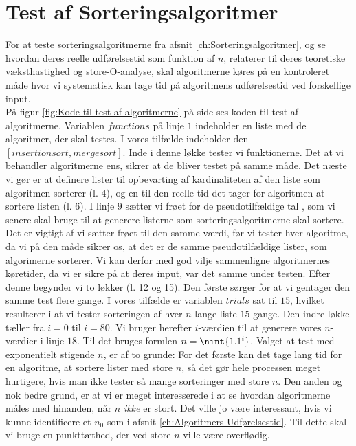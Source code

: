 \section{Test af Sorteringsalgoritmer}
\label{sec:Test af Sorteringsalgoritmer}

For at teste sorteringsalgoritmerne fra afsnit \ref{ch:Sorteringsalgoritmer}, og se hvordan deres reelle udførelsestid som funktion af $n$, relaterer til deres teoretiske væksthastighed og store-O-analyse, skal algoritmerne køres på en kontroleret måde hvor vi systematisk kan tage tid på algoritmens udførelsestid ved forskellige input.\\

På figur \ref{fig:Kode til test af algoritmerne} på side \pageref{fig:Kode til test af algoritmerne} ses koden til test af algoritmerne. Variablen $functions$ på linje $1$ indeholder en liste med de algoritmer, der skal testes. I vores tilfælde indeholder den $[insertionsort,mergesort]$. Inde i denne løkke tester vi funktionerne. Det at vi behandler algoritmerne ens, sikrer at de bliver testet på samme måde. Det næste vi gør er at definere lister til opbevarting af kardinaliteten af den liste som algoritmen sorterer (l. $4$), og en til den reelle tid det tager for algoritmen at sortere listen (l. 6).  I linje $9$ sætter vi frøet for de pseudotilfældige tal \cite{python-random}, som vi senere skal bruge til at generere listerne som sorteringsalgoritmerne skal sortere. Det er vigtigt af vi sætter frøet til den samme værdi, før vi tester hver algoritme, da vi på den måde sikrer os, at det er de samme pseudotilfældige lister, som algorimerne sorterer. Vi kan derfor med god vilje sammenligne algoritmernes køretider, da vi er sikre på at deres input, var det samme under testen. Efter denne  begynder vi to løkker (l. 12 og 15). Den første sørger for at vi gentager den samme test flere gange. I vores tilfælde er variablen $trials$ sat til $15$, hvilket resulterer i at vi tester sorteringen af hver $n$ lange liste $15$ gange. Den indre løkke tæller fra $i=0$ til $i=80$. Vi bruger herefter $i$-værdien til at generere vores $n$-værdier i linje $18$. Til det bruges formlen $n=\nint{1.1^i}$. Valget at test med exponentielt stigende $n$, er af to grunde: For det første kan det tage lang tid for en algoritme, at sortere lister med store $n$, så det gør hele processen meget hurtigere, hvis man ikke tester så mange sorteringer med store $n$. Den anden og nok bedre grund, er at vi er meget interesserede i at se hvordan algoritmerne måles med hinanden, når $n$ \emph{ikke} er stort. Det ville jo være interessant, hvis vi kunne identificere et $n_0$ som i afsnit \ref{ch:Algoritmers Udførelsestid}. Til dette skal vi bruge en punkttæthed, der ved store $n$ ville være overflødig.\\

